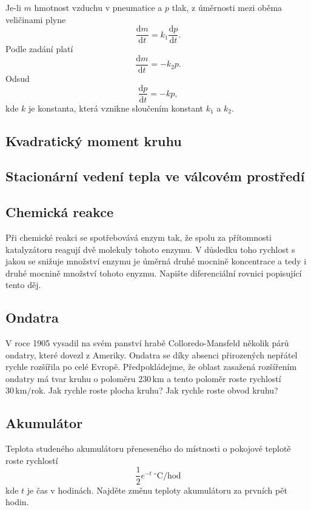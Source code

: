 Je-li $m$ hmotnost vzduchu v pneumatice a $p$ tlak, z úměrnosti mezi oběma veličinami plyne $$\frac{\mathrm dm}{\mathrm dt}=k_1\frac{\mathrm dp}{\mathrm dt}.$$
Podle zadání platí
$$\frac{\mathrm dm}{\mathrm dt}=-k_2p.$$
Odsud $$\frac{\mathrm dp}{\mathrm dt}=-kp,$$
kde $k$ je konstanta, která vznikne sloučením konstant $k_1$ a $k_2$.

\konec

\subsection{Kvadratický moment kruhu}

\subsection{Stacionární vedení tepla ve válcovém prostředí}


\subsection{Chemická reakce}
Při chemické reakci se spotřebovává enzym tak, že spolu za přítomnosti
katalyzátoru reagují dvě molekuly tohoto enzymu. V důsledku toho
rychlost s jakou se snižuje množství enzymu je úměrná druhé mocnině
koncentrace a tedy i druhé mocnině množství tohoto enyzmu. Napište
diferenciální rovnici popisující tento děj.

\subsection{Ondatra} V roce 1905 vysadil na svém panství
  hrabě Colloredo-Mansfeld několik párů
  ondatry, které dovezl z
  Ameriky. Ondatra se díky absenci
  přirozených nepřátel rychle rozšířila
  po celé Evropě. Předpokládejme, že
  oblast zasažená rozšířením ondatry má
  tvar kruhu o poloměru $230\, \mathrm{km}$ a tento
  poloměr roste rychlostí
  $30 \,\mathrm{km}/\mathrm{rok}$. Jak
  rychle roste plocha kruhu? Jak rychle
  roste obvod kruhu?


\subsection{Akumulátor} Teplota studeného akumulátoru přeneseného do místnosti o pokojové teplotě roste rychlostí 
  \begin{equation*}
     \frac 12e^{-t}\  {}^\circ\mathrm{C}/\mathrm{hod}
  \end{equation*}
  kde $t$ je čas v
  hodinách. Najděte změnu teploty akumulátoru za prvních pět hodin.


